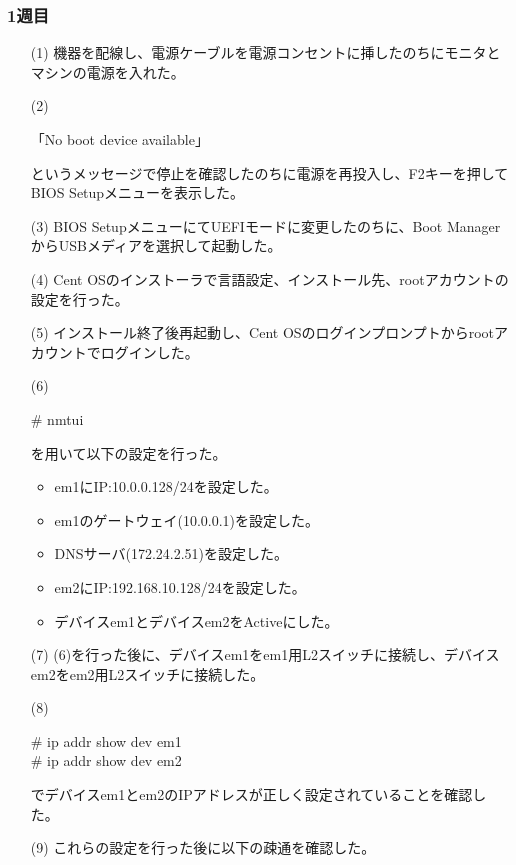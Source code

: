 \documentclass[12pt,a4paper]{jsarticle}
\numberwithin{equation}{section}
\numberwithin{figure}{section}
\numberwithin{table}{section}
\begin{document}
    \subsubsection{1週目}
    \begin{itemize}
      \item [(1)]機器を配線し、電源ケーブルを電源コンセントに挿したのちにモニタとマシンの電源を入れた。
      \item [(2)]\quad
      \begin{screen}
        「No boot device available」
      \end{screen}
      というメッセージで停止を確認したのちに電源を再投入し、F2キーを押してBIOS Setupメニューを表示した。
      \item [(3)]BIOS SetupメニューにてUEFIモードに変更したのちに、Boot ManagerからUSBメディアを選択して起動した。
      \item [(4)]Cent OSのインストーラで言語設定、インストール先、rootアカウントの設定を行った。
      \item [(5)]インストール終了後再起動し、Cent OSのログインプロンプトからrootアカウントでログインした。
      \pagebreak
      \item [(6)]\quad
      \begin{screen}
        \# nmtui
      \end{screen}
      を用いて以下の設定を行った。
        \begin{itemize}
          \item em1にIP:10.0.0.128/24を設定した。
          \item em1のゲートウェイ(10.0.0.1)を設定した。
          \item DNSサーバ(172.24.2.51)を設定した。
          \item em2にIP:192.168.10.128/24を設定した。
          \item デバイスem1とデバイスem2をActiveにした。
        \end{itemize}
      \item [(7)](6)を行った後に、デバイスem1をem1用L2スイッチに接続し、デバイスem2をem2用L2スイッチに接続した。
      \item [(8)]\quad
      \begin{screen}
        \# ip addr show dev em1 \\
        \# ip addr show dev em2
      \end{screen}
      でデバイスem1とem2のIPアドレスが正しく設定されていることを確認した。
      \item [(9)]これらの設定を行った後に以下の疎通を確認した。\\

\end{itemize}
\end{document}

